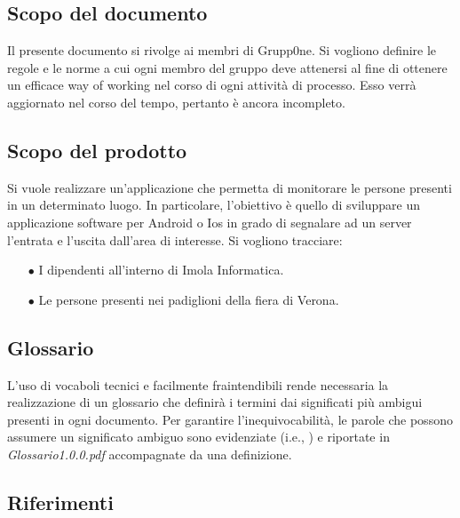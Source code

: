 \documentclass[../norme-di-progetto.tex]{subfiles}
\begin{document}
\subsection{Scopo del documento}
\label{sub:scopo del documento}
Il presente documento si rivolge ai membri di Grupp0ne. Si vogliono definire le regole e le norme a cui ogni membro del gruppo deve attenersi al fine di ottenere un efficace way of working nel corso di ogni attività di processo. Esso verrà aggiornato nel corso del tempo, pertanto è ancora incompleto. 


\subsection{Scopo del prodotto}
\label{sub:scopo del prodotto}
Si vuole realizzare un'applicazione che permetta di monitorare le persone presenti in un determinato luogo. In particolare, l'obiettivo è quello di sviluppare un applicazione software per Android o Ios in grado di segnalare ad un server l'entrata e l'uscita dall'area di interesse.
Si vogliono tracciare:
\begin{itemize}
	\item[$\bullet$]  I dipendenti all'interno di Imola Informatica.
	\item[$\bullet$] Le persone presenti nei padiglioni della fiera di Verona.
\end{itemize}

\subsection{Glossario}
\label{sub:glossario}
L'uso di vocaboli tecnici e facilmente fraintendibili rende necessaria la realizzazione di un glossario che definirà i termini dai significati più ambigui presenti in ogni documento. Per garantire l'inequivocabilità, le parole che possono assumere un significato ambiguo sono evidenziate (i.e., ) e riportate in \textit{Glossario1.0.0.pdf} accompagnate da una definizione.

\subsection{Riferimenti}
\label{sub:riferimenti}
\end{document}
